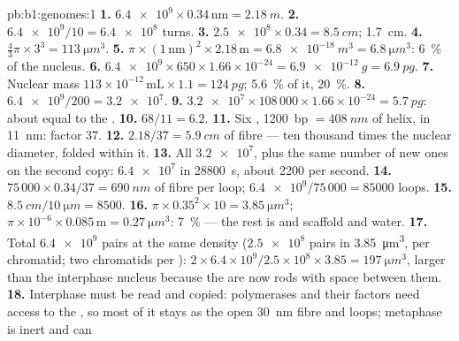 \begin{solution}{pb:b1:genomes:1}
\textbf{1.} $\num{6.4e9}\times 0.34\,\mathrm{nm} = \qty{2.18}{m}$.
\textbf{2.} $\num{6.4e9}/10 = \num{6.4e8}$ turns.
\textbf{3.} $\num{2.5e8}\times 0.34 = \qty{8.5}{cm}$; \qty{1.7}{cm}.
\textbf{4.} $\frac{4}{3}\pi\times 3^3 = \qty{113}{\micro m^3}$.
\textbf{5.} $\pi\times(1\,\mathrm{nm})^2\times 2.18\,\mathrm{m} =
\qty{6.8e-18}{m^3} = \qty{6.8}{\micro m^3}$: \qty{6}{\%} of the nucleus.
\textbf{6.} $\num{6.4e9}\times 650\times 1.66\times 10^{-24} =
\qty{6.9e-12}{g} = \qty{6.9}{pg}$.
\textbf{7.} Nuclear mass $113\times 10^{-12}\,\mathrm{mL}\times 1.1 =
\qty{124}{pg}$;  \qty{5.6}{\%} of it,  \qty{20}{\%}.
\textbf{8.} $\num{6.4e9}/200 = \num{3.2e7}$.
\textbf{9.} $\num{3.2e7}\times 108\,000\times 1.66\times 10^{-24} =
\qty{5.7}{pg}$: about equal to the .
\textbf{10.} $68/11 = 6.2$.
\textbf{11.} Six , \qty{1200}{bp} $= \qty{408}{nm}$ of
helix, in \qty{11}{nm}: factor $37$.
\textbf{12.} $2.18/37 = \qty{5.9}{cm}$ of fibre --- ten thousand times
the nuclear diameter, folded within it.
\textbf{13.} All $\num{3.2e7}$, plus the same number of new ones on the
second copy: $\num{6.4e7}$ in \qty{28800}{s}, about \num{2200} per
second.
\textbf{14.} $75\,000\times 0.34/37 = \qty{690}{nm}$ of fibre per
loop; $\num{6.4e9}/75\,000 = \num{85000}$ loops.
\textbf{15.} $\qty{8.5}{cm}/\qty{10}{\micro m} = 8500$.
\textbf{16.} $\pi\times 0.35^2\times 10 = \qty{3.85}{\micro m^3}$; 
$\pi\times 10^{-6}\times 0.085\,\mathrm{m} = \qty{0.27}{\micro m^3}$:
\qty{7}{\%} --- the rest is  and scaffold  and water.
\textbf{17.} Total  $\num{6.4e9}$ pairs at the same density
($\num{2.5e8}$ pairs in \qty{3.85}{\micro m^3}, per chromatid; two
chromatids per ): $2\times 6.4\times 10^9/2.5\times 10^8\times
3.85 = \qty{197}{\micro m^3}$, larger than the interphase nucleus
because the  are now rods with space between them.
\textbf{18.} Interphase  must be read and copied: polymerases
and their factors need access to the , so most of it stays as the
open \qty{30}{nm} fibre and loops; metaphase  is inert and can

\end{solution}
